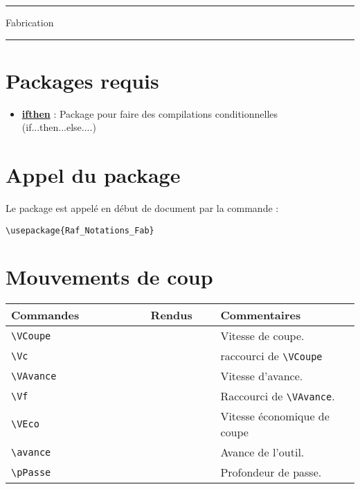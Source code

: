 \documentclass[a4paper,12pt]{article}
\begin{document}
	\begin{center}
		\hrule{\Large Fabrication}\\\hrule
	\end{center}

	\section{Packages requis}

		\begin{itemize}
			\item \href{http://www.ctan.org/pkg/ifthen}{\textbf{ifthen}} : Package pour faire des compilations conditionnelles (if...then...else....)
		\end{itemize}

	\section{Appel du package}
	
Le package est appelé en début de document par la commande :

\begin{verbatim}
\usepackage{Raf_Notations_Fab}
\end{verbatim}



	\section{Mouvements de coup}
		\noindent
		\begin{tabular}{|p{0.4\linewidth}|p{0.2\linewidth}|p{0.4\linewidth}|}
			\hline
				\textbf{Commandes}&\textbf{Rendus}&\textbf{Commentaires}
			\\\hline\hline
				\verb!\VCoupe!		&	\VCoupe		&	Vitesse de coupe.
			\\\hline
				\verb!\Vc!		&	\Vc		&	raccourci de \verb!\VCoupe!
			\\\hline
				\verb!\VAvance!		&	\VAvance		&	Vitesse d'avance.
			\\\hline
				\verb!\Vf!		&	\Vf		&	Raccourci de \verb!\VAvance!.
			\\\hline
				\verb!\VEco!		&	\VEco		&	Vitesse économique de coupe
			\\\hline
				\verb!\avance!		&	\avance		&	Avance de l'outil.
			\\\hline
				\verb!\pPasse!		&	\pPasse		&	Profondeur de passe.
			\\\hline
		\end{tabular}
\end{document}
